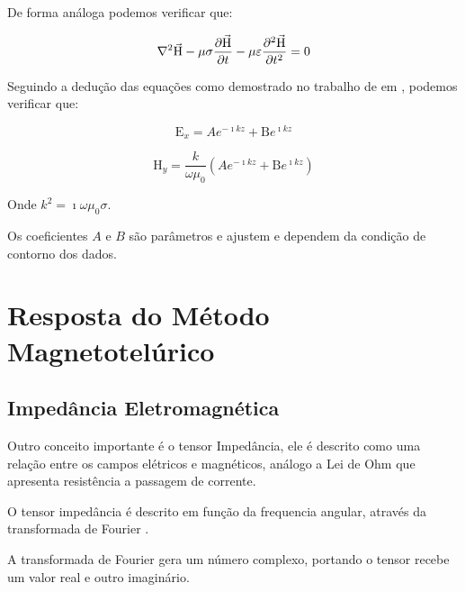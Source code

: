             De forma análoga podemos verificar que:
            
            \begin{equation}
             \nabla^2 \vec{\textrm{H}} - \mu \sigma \dfrac{\partial \vec{\textrm{H}}}{\partial t} - \mu \varepsilon \dfrac{\partial^2 \vec{\textrm{H}}}{\partial t^2} = 0
            \end{equation}

            Seguindo a dedução das equações como demostrado no trabalho de \citeauthor{didana2010} em \citeyearpar{didana2010}, podemos verificar que:
            
            \begin{equation}
            \label{Ex_AB}
             \textrm{E}_x = A e^{-\imath k z} + \textrm{B} e^{\imath k z}
            \end{equation}
            
            \begin{equation}
            \label{Hy_AB}
             \textrm{H}_y = \dfrac{k}{\omega \mu_0} (A e^{-\imath k z} + \textrm{B} e^{\imath k z})
            \end{equation}

            Onde $k^2 = \imath \omega \mu_0 \sigma$.

            Os coeficientes $A$ e $B$ são parâmetros e ajustem e dependem da condição de contorno dos dados. 
    
    
    
    \section{Resposta do Método Magnetotelúrico}
        \subsection{Impedância Eletromagnética}
        \label{subsec-Impedancia}
        Outro conceito importante é o tensor Impedância, ele é descrito como uma
	    relação entre os campos elétricos e magnéticos, análogo a Lei de Ohm \cite{eletromag8hayt}
	    que apresenta resistência a passagem de corrente.
	    
	    O tensor impedância é descrito em função da frequencia angular, através da transformada de Fourier \cite{fourier}.
	    
	    A transformada de Fourier gera um número complexo, portando o tensor recebe um valor real e outro imaginário.    
	    
